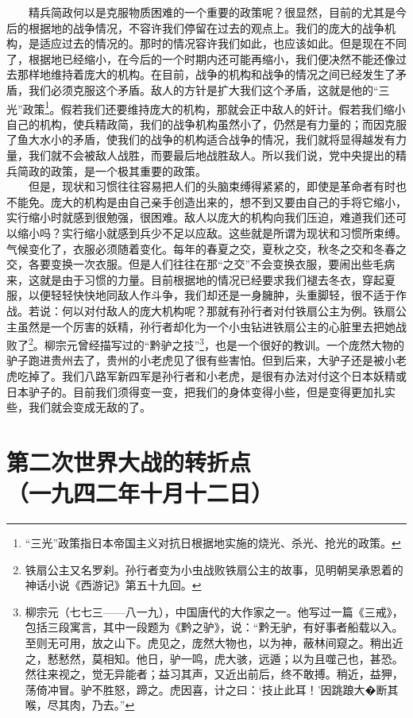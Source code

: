 \documentclass[cn,11pt,chinese]{elegantbook}
\def\myformat#1{\hfil\hfil #1}
\begin{document}
　　精兵简政何以是克服物质困难的一个重要的政策呢？很显然，目前的尤其是今后的根据地的战争情况，不容许我们停留在过去的观点上。我们的庞大的战争机构，是适应过去的情况的。那时的情况容许我们如此，也应该如此。但是现在不同了，根据地已经缩小，在今后的一个时期内还可能再缩小，我们便决然不能还像过去那样地维持着庞大的机构。在目前，战争的机构和战争的情况之间已经发生了矛盾，我们必须克服这个矛盾。敌人的方针是扩大我们这个矛盾，这就是他的“三光”政策\footnote[2]{ “三光”政策指日本帝国主义对抗日根据地实施的烧光、杀光、抢光的政策。}。假若我们还要维持庞大的机构，那就会正中敌人的奸计。假若我们缩小自己的机构，使兵精政简，我们的战争机构虽然小了，仍然是有力量的；而因克服了鱼大水小的矛盾，使我们的战争的机构适合战争的情况，我们就将显得越发有力量，我们就不会被敌人战胜，而要最后地战胜敌人。所以我们说，党中央提出的精兵简政的政策，是一个极其重要的政策。\\
　　但是，现状和习惯往往容易把人们的头脑束缚得紧紧的，即使是革命者有时也不能免。庞大的机构是由自己亲手创造出来的，想不到又要由自己的手将它缩小，实行缩小时就感到很勉强，很困难。敌人以庞大的机构向我们压迫，难道我们还可以缩小吗？实行缩小就感到兵少不足以应敌。这些就是所谓为现状和习惯所束缚。气候变化了，衣服必须随着变化。每年的春夏之交，夏秋之交，秋冬之交和冬春之交，各要变换一次衣服。但是人们往往在那“之交”不会变换衣服，要闹出些毛病来，这就是由于习惯的力量。目前根据地的情况已经要求我们褪去冬衣，穿起夏服，以便轻轻快快地同敌人作斗争，我们却还是一身臃肿，头重脚轻，很不适于作战。若说：何以对付敌人的庞大机构呢？那就有孙行者对付铁扇公主为例。铁扇公主虽然是一个厉害的妖精，孙行者却化为一个小虫钻进铁扇公主的心脏里去把她战败了\footnote[3]{ 铁扇公主又名罗刹。孙行者变为小虫战败铁扇公主的故事，见明朝吴承恩着的神话小说《西游记》第五十九回。}。柳宗元曾经描写过的“黔驴之技”\footnote[4]{ 柳宗元（七七三——八一九），中国唐代的大作家之一。他写过一篇《三戒》，包括三段寓言，其中一段题为《黔之驴》，说：“黔无驴，有好事者船载以入。至则无可用，放之山下。虎见之，庞然大物也，以为神，蔽林间窥之。稍出近之，慭慭然，莫相知。他日，驴一鸣，虎大骇，远遁；以为且噬己也，甚恐。然往来视之，觉无异能者；益习其声，又近出前后，终不敢搏。稍近，益狎，荡倚冲冒。驴不胜怒，蹄之。虎因喜，计之曰：‘技止此耳！’因跳踉大�\，断其喉，尽其肉，乃去。”}，也是一个很好的教训。一个庞然大物的驴子跑进贵州去了，贵州的小老虎见了很有些害怕。但到后来，大驴子还是被小老虎吃掉了。我们八路军新四军是孙行者和小老虎，是很有办法对付这个日本妖精或日本驴子的。目前我们须得变一变，把我们的身体变得小些，但是变得更加扎实些，我们就会变成无敌的了。\\
\newpage\section*{\myformat{第二次世界大战的转折点}\\\myformat{（一九四二年十月十二日）}}
\end{document}
